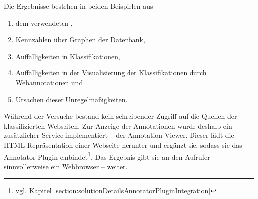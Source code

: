     Die Ergebnisse bestehen in beiden Beispielen aus 

    \begin{enumerate}
        \item dem verwendeten {\classificationModel},
        \item Kennzahlen über Graphen der Datenbank,
        \item Auffälligkeiten in Klassifikationen,
        \item Auffälligkeiten in der Visualisierung der Klassifikationen durch Webannotationen und
        \item Ursachen dieser Unregelmäßigkeiten.
    \end{enumerate}

    Während der Versuche bestand kein schreibender Zugriff auf die Quellen der klassifizierten Webseiten.
    Zur Anzeige der Annotationen wurde deshalb ein zusätzlicher Service implementiert -- der Annotation Viewer.
    Dieser lädt die HTML-Repräsentation einer Webseite herunter und ergänzt sie,
    sodass sie das Annotator Plugin einbindet\footnote{vgl. Kapitel \ref{section:solutionDetailsAnnotatorPluginIntegration}}.
    Das Ergebnis gibt sie an den Aufrufer -- sinnvollerweise ein Webbrowser -- weiter.
